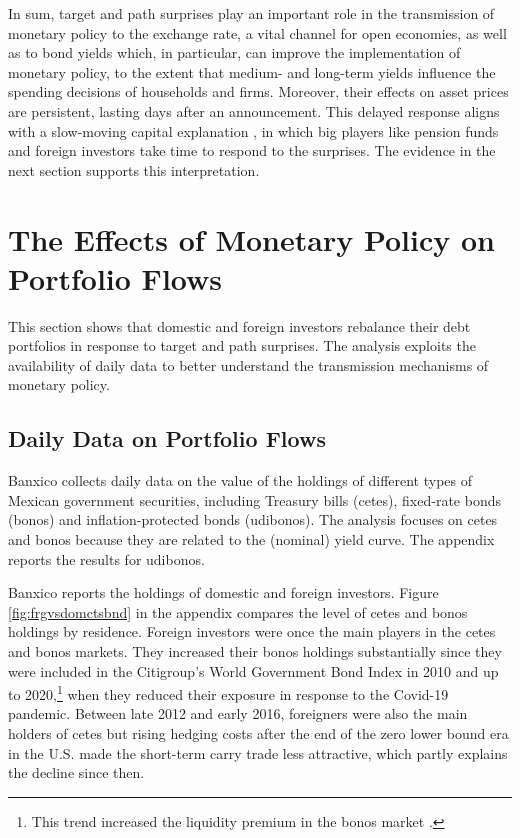 \documentclass[a4paper, 12pt]{article}
\begin{document}
In sum, target and path surprises play an important role in the transmission of monetary policy to the exchange rate, a vital channel for open economies, as well as to bond yields which, in particular, can improve the implementation of monetary policy, to the extent that medium- and long-term yields influence the spending decisions of households and firms. 
Moreover, their effects on asset prices are persistent, lasting days after an announcement. 
This delayed response aligns with a slow-moving capital explanation \parencite{Duffie:2010}, in which big players like pension funds and foreign investors take time to respond to the surprises. 
The evidence in the next section supports this interpretation. 


\section{The Effects of Monetary Policy on Portfolio Flows} \label{sec:flows}
This section shows that domestic and foreign investors rebalance their debt portfolios in response to target and path surprises. The analysis exploits the availability of daily data to better understand the transmission mechanisms of monetary policy. 

\subsection{Daily Data on Portfolio Flows} \label{sec:flowsdaily}
Banxico collects daily data on the value of the holdings of different types of Mexican government securities, including Treasury bills (cetes), fixed-rate bonds (bonos) and inflation-protected bonds (udibonos). 
The analysis focuses on cetes and bonos because they are related to the (nominal) yield curve. The appendix reports the results for udibonos.

Banxico reports the holdings of domestic and foreign investors. 
Figure \ref{fig:frgvsdomctsbnd} in the appendix compares the level of cetes and bonos holdings by residence. 
Foreign investors were once the main players in the cetes and bonos markets. They increased their bonos holdings substantially since they were included in the Citigroup's World Government Bond Index in 2010 \parencite{Banxico:2014} and up to 2020,\footnote{This trend increased the liquidity premium in the bonos market \parencite{CFS:2021}.} when they reduced their exposure in response to the Covid-19 pandemic. 
Between late 2012 and early 2016, foreigners were also the main holders of cetes but rising hedging costs after the end of the zero lower bound era in the U.S. made the short-term carry trade less attractive, which partly explains the decline since then. 
\end{document}
